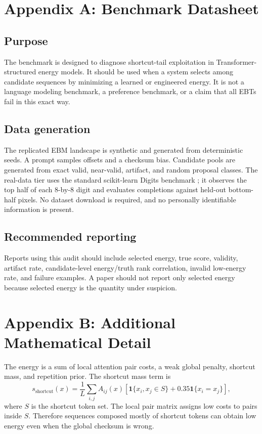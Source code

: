 \documentclass{article}
\newcommand{\short}{s_{\mathrm{shortcut}}}
\begin{document}
\appendix

\section{Appendix A: Benchmark Datasheet}

\subsection{Purpose}

The benchmark is designed to diagnose shortcut-tail exploitation in
Transformer-structured energy models. It should be used when a system selects
among candidate sequences by minimizing a learned or engineered energy. It is
not a language modeling benchmark, a preference benchmark, or a claim that all
EBTs fail in this exact way.

\subsection{Data generation}

The replicated EBM landscape is synthetic and generated from deterministic
seeds. A prompt samples offsets and a checksum bias. Candidate pools are
generated from exact valid, near-valid, artifact, and random proposal classes.
The real-data tier uses the standard scikit-learn Digits benchmark
\citep{pedregosa2011sklearn}; it observes the top half of each 8-by-8 digit and
evaluates completions against held-out bottom-half pixels. No dataset download
is required, and no personally identifiable information is present.

\subsection{Recommended reporting}

Reports using this audit should include selected energy, true score, validity,
artifact rate, candidate-level energy/truth rank correlation, invalid
low-energy rate, and failure examples. A paper should not report only selected
energy because selected energy is the quantity under suspicion.

\section{Appendix B: Additional Mathematical Detail}

The energy is a sum of local attention pair costs, a weak global penalty,
shortcut mass, and repetition prior. The shortcut mass term is
\[
\short(x)=\frac{1}{L}\sum_{i,j}A_{ij}(x)
\left[\mathbf{1}\{x_i,x_j\in S\}+0.35\mathbf{1}\{x_i=x_j\}\right],
\]
where $S$ is the shortcut token set. The local pair matrix assigns low costs to
pairs inside $S$. Therefore sequences composed mostly of shortcut tokens can
obtain low energy even when the global checksum is wrong.
\end{document}
